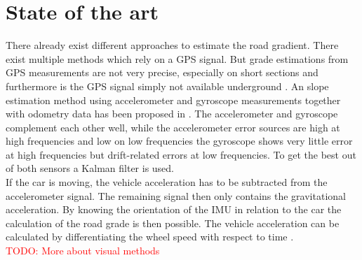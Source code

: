 \documentclass{paper}
\newcommand{\todo}[1]{\textcolor{red}{TODO: #1}}
\begin{document}
\section{State of the art}
There already exist different approaches to estimate the road gradient. There exist multiple methods which rely on a GPS signal. But grade estimations from GPS measurements are not very precise, especially on short sections and furthermore is the GPS signal simply not available underground \cite{8103753}.
An slope estimation method using accelerometer and gyroscope measurements together with odometry data has been proposed in \cite{palella2016sensor}. The accelerometer and gyroscope complement each other well, while the accelerometer error sources are high at high frequencies and low on low frequencies the gyroscope shows very little error at high frequencies but drift-related errors at low frequencies. To get the best out of both sensors a Kalman filter is used.\\
If the car is moving, the vehicle acceleration has to be subtracted from the accelerometer signal. The remaining signal then only contains the gravitational acceleration. By knowing the orientation of the IMU in relation to the car the calculation of the road grade is then possible. The vehicle acceleration can be calculated by differentiating the wheel speed with respect to time \cite{patent}.\\
\todo{More about visual methods}
\end{document}
